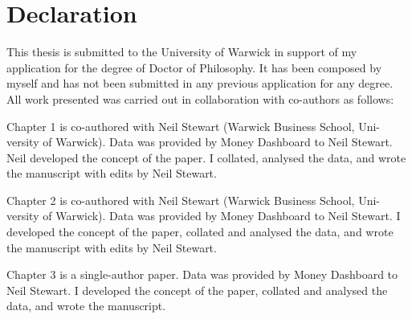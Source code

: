 
\chapter*{Declaration}%
\label{cha:declaration}

This thesis is submitted to the University of Warwick in support of my
application for the degree of Doctor of Philosophy. It has been composed by
myself and has not been submitted in any previous application for any degree.
All work presented was carried out in collaboration with co-authors as follows:

Chapter 1 is co-authored with Neil Stewart (Warwick Business School, Uni-
versity of Warwick). Data was provided by Money Dashboard to Neil Stewart.
Neil developed the concept of the paper. I collated, analysed the data, and
wrote the manuscript with edits by Neil Stewart.

Chapter 2 is co-authored with Neil Stewart (Warwick Business School, Uni-
versity of Warwick). Data was provided by Money Dashboard to Neil Stewart.
I developed the concept of the paper, collated and analysed the data, and
wrote the manuscript with edits by Neil Stewart.

Chapter 3 is a single-author paper. Data was provided by Money Dashboard to
Neil Stewart. I developed the concept of the paper, collated and analysed the
data, and wrote the manuscript.

